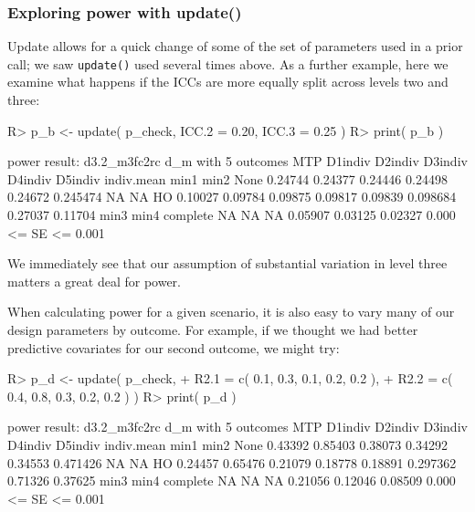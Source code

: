 \documentclass[
]{jss}
\begin{document}
\subsubsection{Exploring power with update()}

Update allows for a quick change of some of the set of parameters used
in a prior call; we saw \texttt{update()} used several times above. As a
further example, here we examine what happens if the ICCs are more
equally split across levels two and three:

\begin{CodeChunk}
\begin{CodeInput}
R> p_b <- update( p_check, ICC.2 = 0.20, ICC.3 = 0.25 )
R> print( p_b )
\end{CodeInput}
\begin{CodeOutput}
power result: d3.2_m3fc2rc d_m with 5 outcomes
  MTP D1indiv D2indiv D3indiv D4indiv D5indiv indiv.mean    min1    min2
 None 0.24744 0.24377 0.24446 0.24498 0.24672   0.245474      NA      NA
   HO 0.10027 0.09784 0.09875 0.09817 0.09839   0.098684 0.27037 0.11704
    min3    min4 complete
      NA      NA       NA
 0.05907 0.03125  0.02327
    0.000 <= SE <= 0.001
\end{CodeOutput}
\end{CodeChunk}

We immediately see that our assumption of substantial variation in level
three matters a great deal for power.

When calculating power for a given scenario, it is also easy to vary
many of our design parameters by outcome. For example, if we thought we
had better predictive covariates for our second outcome, we might try:

\begin{CodeChunk}
\begin{CodeInput}
R> p_d <- update( p_check,
+                  R2.1 = c( 0.1, 0.3, 0.1, 0.2, 0.2 ),
+                  R2.2 = c( 0.4, 0.8, 0.3, 0.2, 0.2 ) )
R> print( p_d )
\end{CodeInput}
\begin{CodeOutput}
power result: d3.2_m3fc2rc d_m with 5 outcomes
  MTP D1indiv D2indiv D3indiv D4indiv D5indiv indiv.mean    min1    min2
 None 0.43392 0.85403 0.38073 0.34292 0.34553   0.471426      NA      NA
   HO 0.24457 0.65476 0.21079 0.18778 0.18891   0.297362 0.71326 0.37625
    min3    min4 complete
      NA      NA       NA
 0.21056 0.12046  0.08509
    0.000 <= SE <= 0.001
\end{CodeOutput}
\end{CodeChunk}
\end{document}
